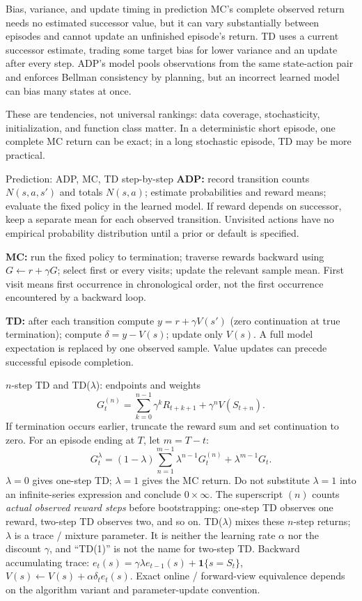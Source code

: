 \documentclass[10pt,a4paper]{article}
\newcommand{\ind}{\mathbf 1}
\begin{document}
\begin{card}{Bias, variance, and update timing in prediction}
MC's complete observed return needs no estimated successor value, but it can vary substantially between episodes and cannot update an unfinished episode's return. TD uses a current successor estimate, trading some target bias for lower variance and an update after every step. ADP's model pools observations from the same state-action pair and enforces Bellman consistency by planning, but an incorrect learned model can bias many states at once.

These are tendencies, not universal rankings: data coverage, stochasticity, initialization, and function class matter. In a deterministic short episode, one complete MC return can be exact; in a long stochastic episode, TD may be more practical.
\end{card}
\begin{card}{Prediction: ADP, MC, TD step-by-step}
\textbf{ADP:} record transition counts $N(s,a,s')$ and totals $N(s,a)$; estimate probabilities and reward means; evaluate the fixed policy in the learned model. If reward depends on successor, keep a separate mean for each observed transition. Unvisited actions have no empirical probability distribution until a prior or default is specified.

\textbf{MC:} run the fixed policy to termination; traverse rewards backward using $G\leftarrow r+\gamma G$; select first or every visits; update the relevant sample mean. First visit means first occurrence in chronological order, not the first occurrence encountered by a backward loop.

\textbf{TD:} after each transition compute $y=r+\gamma V(s')$ (zero continuation at true termination); compute $\delta=y-V(s)$; update only $V(s)$. A full model expectation is replaced by one observed sample. Value updates can precede successful episode completion.
\end{card}

\begin{card}{$n$-step TD and TD($\lambda$): endpoints and weights}
\[
G_t^{(n)}=\sum_{k=0}^{n-1}\gamma^kR_{t+k+1}+\gamma^nV(S_{t+n}).
\]
If termination occurs earlier, truncate the reward sum and set continuation to zero. For an episode ending at $T$, let $m=T-t$:
\[
G_t^\lambda=(1-\lambda)\sum_{n=1}^{m-1}\lambda^{n-1}G_t^{(n)}+\lambda^{m-1}G_t.
\]
$\lambda=0$ gives one-step TD; $\lambda=1$ gives the MC return. Do not substitute $\lambda=1$ into an infinite-series expression and conclude $0\times\infty$.
The superscript $(n)$ counts \emph{actual observed reward steps} before bootstrapping: one-step TD observes one reward, two-step TD observes two, and so on. TD($\lambda$) mixes these $n$-step returns; $\lambda$ is a trace / mixture parameter. It is neither the learning rate $\alpha$ nor the discount $\gamma$, and ``TD(1)'' is not the name for two-step TD.
Backward accumulating trace: $e_t(s)=\gamma\lambda e_{t-1}(s)+\ind\{s=S_t\}$, $V(s)\leftarrow V(s)+\alpha\delta_te_t(s)$. Exact online / forward-view equivalence depends on the algorithm variant and parameter-update convention.
\end{card}
\end{document}
